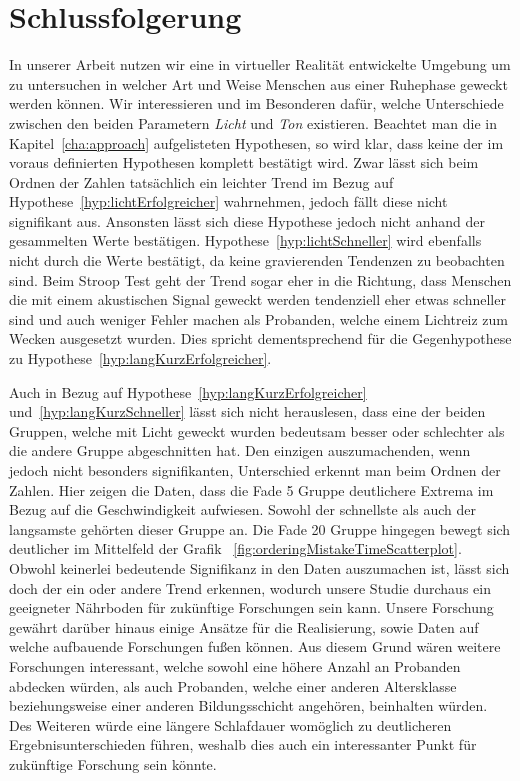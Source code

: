 \chapter{Schlussfolgerung}


In unserer Arbeit nutzen wir eine in virtueller Realität entwickelte Umgebung um zu untersuchen in welcher Art und Weise Menschen aus einer Ruhephase geweckt werden können.
Wir interessieren und im Besonderen dafür, welche Unterschiede zwischen den beiden Parametern \textit{Licht} und \textit{Ton} existieren. 
Beachtet man die in Kapitel~\ref{cha:approach} aufgelisteten Hypothesen, so wird klar, dass keine der im voraus definierten Hypothesen komplett bestätigt wird. 
Zwar lässt sich beim Ordnen der Zahlen tatsächlich ein leichter Trend im Bezug auf Hypothese~\ref{hyp:lichtErfolgreicher} wahrnehmen, jedoch fällt diese nicht signifikant aus. 
Ansonsten lässt sich diese Hypothese jedoch nicht anhand der gesammelten Werte bestätigen. 
Hypothese~\ref{hyp:lichtSchneller} wird ebenfalls nicht durch die Werte bestätigt, da keine gravierenden Tendenzen zu beobachten sind.
Beim Stroop Test geht der Trend sogar eher in die Richtung, dass Menschen die mit einem akustischen Signal geweckt werden tendenziell eher etwas schneller sind und auch weniger Fehler machen als Probanden, welche einem Lichtreiz zum Wecken ausgesetzt wurden.
Dies spricht dementsprechend für die Gegenhypothese zu Hypothese~\ref{hyp:langKurzErfolgreicher}.

Auch in Bezug auf Hypothese~\ref{hyp:langKurzErfolgreicher} und~\ref{hyp:langKurzSchneller} lässt sich nicht herauslesen, dass eine der beiden Gruppen, welche mit Licht geweckt wurden bedeutsam besser oder schlechter als die andere Gruppe abgeschnitten hat. 
Den einzigen auszumachenden, wenn jedoch nicht besonders signifikanten, Unterschied erkennt man beim Ordnen der Zahlen. 
Hier zeigen die Daten, dass die Fade 5 Gruppe deutlichere Extrema im Bezug auf die Geschwindigkeit aufwiesen. 
Sowohl der schnellste als auch der langsamste gehörten dieser Gruppe an. 
Die Fade 20 Gruppe hingegen bewegt sich deutlicher im Mittelfeld der Grafik ~\ref{fig:orderingMistakeTimeScatterplot}.
Obwohl keinerlei bedeutende Signifikanz in den Daten auszumachen ist, lässt sich doch der ein oder andere Trend erkennen, wodurch unsere Studie durchaus ein geeigneter Nährboden für zukünftige Forschungen sein kann. Unsere Forschung gewährt darüber hinaus einige Ansätze für die Realisierung, sowie Daten auf welche aufbauende Forschungen fußen können. Aus diesem Grund wären weitere Forschungen interessant, welche sowohl eine höhere Anzahl an Probanden abdecken würden, als auch Probanden, welche einer anderen Altersklasse beziehungsweise einer anderen Bildungsschicht angehören, beinhalten würden. Des Weiteren würde eine längere Schlafdauer womöglich zu deutlicheren Ergebnisunterschieden führen, weshalb dies auch ein interessanter Punkt für zukünftige Forschung sein könnte.

